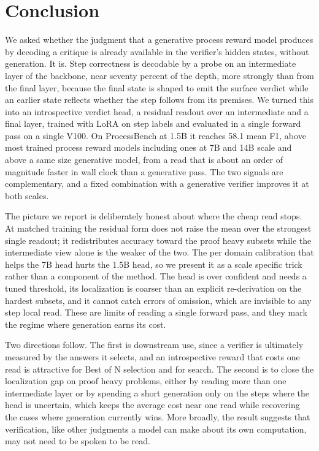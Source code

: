 
\section{Conclusion}
\label{sec:conclusion}

We asked whether the judgment that a generative process reward model produces by decoding a critique is already available in the verifier's hidden states, without generation. It is. Step correctness is decodable by a probe on an intermediate layer of the backbone, near seventy percent of the depth, more strongly than from the final layer, because the final state is shaped to emit the surface verdict while an earlier state reflects whether the step follows from its premises. We turned this into an introspective verdict head, a residual readout over an intermediate and a final layer, trained with LoRA on step labels and evaluated in a single forward pass on a single V100. On ProcessBench at 1.5B it reaches 58.1 mean F1, above most trained process reward models including ones at 7B and 14B scale and above a same size generative model, from a read that is about an order of magnitude faster in wall clock than a generative pass. The two signals are complementary, and a fixed combination with a generative verifier improves it at both scales.

The picture we report is deliberately honest about where the cheap read stops. At matched training the residual form does not raise the mean over the strongest single readout; it redistributes accuracy toward the proof heavy subsets while the intermediate view alone is the weaker of the two. The per domain calibration that helps the 7B head hurts the 1.5B head, so we present it as a scale specific trick rather than a component of the method. The head is over confident and needs a tuned threshold, its localization is coarser than an explicit re-derivation on the hardest subsets, and it cannot catch errors of omission, which are invisible to any step local read. These are limits of reading a single forward pass, and they mark the regime where generation earns its cost.

Two directions follow. The first is downstream use, since a verifier is ultimately measured by the answers it selects, and an introspective reward that costs one read is attractive for Best of N selection and for search. The second is to close the localization gap on proof heavy problems, either by reading more than one intermediate layer or by spending a short generation only on the steps where the head is uncertain, which keeps the average cost near one read while recovering the cases where generation currently wins. More broadly, the result suggests that verification, like other judgments a model can make about its own computation, may not need to be spoken to be read.
